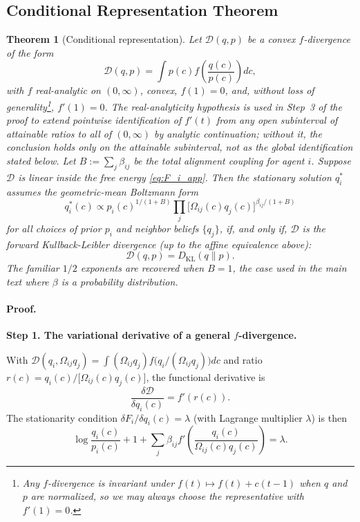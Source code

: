 \documentclass[11pt]{article}
\newtheorem{theorem}{Theorem}
\begin{document}
\subsection*{Conditional Representation Theorem}

\begin{theorem}[Conditional representation]\label{thm:representation_app}
Let\/ $\mathcal{D}(q,p)$ be a convex $f$-divergence of the form
\[
\mathcal{D}(q,p)
= \int p(c)f\left(\frac{q(c)}{p(c)}\right)dc,
\]
with $f$ \emph{real-analytic on $(0, \infty)$}, convex, $f(1)=0$, and, without loss of generality\footnote{Any $f$-divergence is invariant under $f(t)\mapsto f(t)+c(t-1)$ when $q$ and $p$ are normalized, so we may always choose the representative with $f'(1)=0$.}, $f'(1)=0$. The real-analyticity hypothesis is used in Step~3 of the proof to extend pointwise identification of $f'(t)$ from any open subinterval of attainable ratios to all of $(0, \infty)$ by analytic continuation; without it, the conclusion holds only on the attainable subinterval, not as the global identification stated below. Let $B := \sum_j \beta_{ij}$ be the total alignment coupling for agent $i$. Suppose $\mathcal{D}$ is linear inside the free energy \eqref{eq:F_i_app}. Then the stationary solution $q_i^*$ assumes the geometric-mean Boltzmann form
\begin{equation}
q_i^*(c) \propto p_i(c)^{1/(1+B)}\prod_{j}\bigl[\Omega_{ij}(c)q_j(c)\bigr]^{\beta_{ij}/(1+B)}
\label{eq:geometric_mean_target_app}
\end{equation}
for all choices of prior $p_i$ and neighbor beliefs $\{q_j\}$, if, and only if, $\mathcal{D}$ is the forward Kullback-Leibler divergence (up to the affine equivalence above):
\[
\mathcal{D}(q,p) = D_{\mathrm{KL}}(q\|p).
\]
The familiar $1/2$ exponents are recovered when $B = 1$, the case used in the main text where $\beta$ is a probability distribution.
\end{theorem}

\paragraph{Proof.}

\textbf{Step 1. The variational derivative of a general $f$-divergence.}

With $\mathcal{D}(q_i,\Omega_{ij}q_j)=\int (\Omega_{ij}q_j)f\bigl(q_i/(\Omega_{ij}q_j)\bigr)dc$ and ratio $r(c)=q_i(c)/\bigl[\Omega_{ij}(c)q_j(c)\bigr]$, the functional derivative is
\begin{equation}
\frac{\delta\mathcal{D}}{\delta q_i(c)} = f'(r(c)).
\end{equation}
The stationarity condition $\delta F_i/\delta q_i(c)=\lambda$ (with Lagrange multiplier $\lambda$) is then
\begin{equation}
\log\frac{q_i(c)}{p_i(c)} + 1
+ \sum_j \beta_{ij}f'\left(\frac{q_i(c)}{\Omega_{ij}(c)q_j(c)}\right) = \lambda.
\label{eq:general_stationarity_app}
\end{equation}
\end{document}
